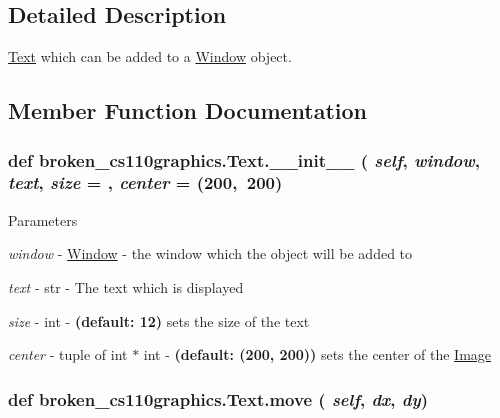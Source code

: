 \subsection{Detailed Description}
\hyperlink{classbroken__cs110graphics_1_1Text}{Text} which can be added to a \hyperlink{classbroken__cs110graphics_1_1Window}{Window} object. 

\subsection{Member Function Documentation}
\hypertarget{classbroken__cs110graphics_1_1Text_aeee37e21cddfdc4ca5c6031f05309965}{
\subsubsection[{\_\-\_\-init\_\-\_\-}]{\setlength{\rightskip}{0pt plus 5cm}def broken\_\-cs110graphics.Text.\_\-\_\-init\_\-\_\- ( {\em self}, \/   {\em window}, \/   {\em text}, \/   {\em size} = {}, \/   {\em center} = {\ttfamily (200,~200})}}
\label{classbroken__cs110graphics_1_1Text_aeee37e21cddfdc4ca5c6031f05309965}

\begin{DoxyParams}{Parameters}
\item[{\em window}]-\/ \hyperlink{classbroken__cs110graphics_1_1Window}{Window} -\/ the window which the object will be added to \item[{\em text}]-\/ str -\/ The text which is displayed \item[{\em size}]-\/ int -\/ {\bfseries (default: 12)} sets the size of the text \item[{\em center}]-\/ tuple of int $\ast$ int -\/ {\bfseries (default: (200, 200))} sets the center of the \hyperlink{classbroken__cs110graphics_1_1Image}{Image} \end{DoxyParams}
\hypertarget{classbroken__cs110graphics_1_1Text_af3be5a72b80b128967fba27b7d9ddaa1}{
\subsubsection[{move}]{\setlength{\rightskip}{0pt plus 5cm}def broken\_\-cs110graphics.Text.move ( {\em self}, \/   {\em dx}, \/   {\em dy})}}
\label{classbroken__cs110graphics_1_1Text_af3be5a72b80b128967fba27b7d9ddaa1}


